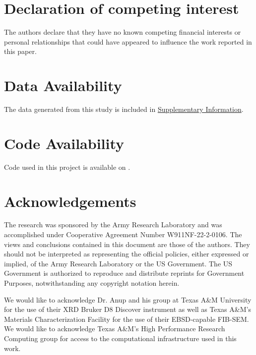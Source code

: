 \documentclass[letterpaper,4pt,times,preprint]{elsarticle}
\begin{document}
\section*{Declaration of competing interest}

    The authors declare that they have no known competing financial interests or personal relationships that could have appeared to influence the work reported in this paper.

\section*{Data Availability}

    The data generated from this study is included in \underline{Supplementary Information}.

\section*{Code Availability}

    Code used in this project is available on .

\section{Acknowledgements}

The research was sponsored by the Army Research Laboratory and was accomplished under Cooperative Agreement Number W911NF-22-2-0106. The views and conclusions contained in this document are those of the authors. They should not be interpreted as representing the official policies, either expressed or implied, of the Army Research Laboratory or the US Government. The US Government is authorized to reproduce and distribute reprints for Government Purposes, notwithstanding any copyright notation herein. 
    
We would like to acknowledge Dr. Anup and his group at Texas A\&M University for the use of their XRD Bruker D8 Discover instrument as well as Texas A\&M’s Materials Characterization Facility for the use of their EBSD-capable FIB-SEM. We would like to acknowledge Texas A\&M’s High Performance Research Computing group for access to the computational infrastructure used in this work.




\end{document}
